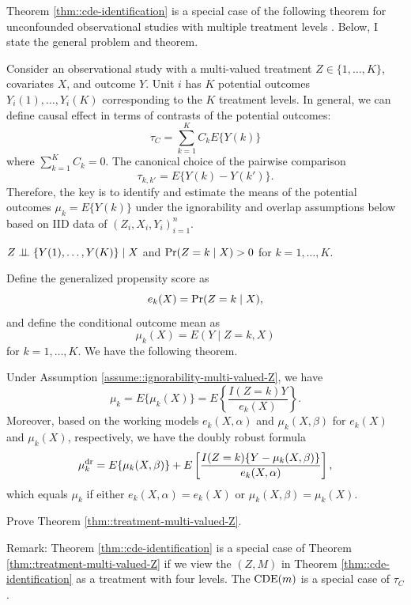 \begin{HomeworkProblem}\label{exr:28-2}

Theorem \ref{thm::cde-identification} is a special case of the following theorem for unconfounded observational studies with multiple treatment levels \citep{imai2004causal, cattaneo2010efficient}. Below, I state the general problem and theorem.



Consider an observational study with a multi-valued treatment $Z \in \{ 1, \ldots, K \}$, covariates $X$, and outcome $Y$. Unit $i$ has $K$ potential outcomes $Y_i(1), \ldots, Y_i(K)$ corresponding to the $K$ treatment levels. In general, we can define causal effect in terms of contrasts of the potential outcomes:
\[
\tau_C  = \sum_{k=1}^K C_k   E\{  Y(k) \}
\]
where $  \sum_{k=1}^K C_k  = 0$. The canonical choice of the pairwise comparison
\[
\tau_{k,k'} = E\{   Y(k) - Y(k') \}.
\]
Therefore, the key is to identify and estimate the means of the potential outcomes $\mu_k  =  E\{  Y(k) \}$ under the ignorability and overlap assumptions below based on IID data of $(Z_i,  X_i, Y_i)_{i=1}^n$.



\begin{assumption}
\label{assume::ignorability-multi-valued-Z}
$Z\mathrel{\perp\!\!\!\perp} \{ Y (1), \ldots, Y (K) \} \mid X$ and $\operatorname{Pr}(Z = k \mid X) > 0$ for $k=1,\ldots, K.$
\end{assumption}



Define the generalized propensity score as
\[
e_k(X) = \operatorname{Pr}(Z = k \mid X),
\]
and define the conditional outcome mean as
\[
\mu_k(X) = E(   Y \mid Z=k,  X )
\]
for $k=1, \ldots, K.$ We have the following theorem.

\begin{Theorem}
\label{thm::treatment-multi-valued-Z}
Under Assumption \ref{assume::ignorability-multi-valued-Z}, we have
\[
\mu_{k} = E\{  \mu_{k}(X) \}
= E \left\{   \frac{I(Z = k) Y}{  e_{k}(X)  }  \right\} .
\]
Moreover, based on the working models $e_{k}(X, \alpha) $ and $\mu_{k}(X, \beta) $ for $e_{k}(X) $ and $\mu_{k}(X) $, respectively, we have the doubly robust  formula
\[
\mu_{k}^{\textup{dr}}  = E\{  \mu_{k}(X, \beta) \} + E \left[   \frac{I(Z=k) \{ Y - \mu_{k}(X, \beta)  \}}{  e_{k}(X, \alpha)  }  \right],
\]
which equals $\mu_{k} $ if either $e_{k}(X, \alpha) = e_{k}(X)$ or $\mu_{k}(X, \beta)  = \mu_{k}(X)$.
\end{Theorem}


Prove Theorem \ref{thm::treatment-multi-valued-Z}.


Remark: Theorem \ref{thm::cde-identification} is a special case of Theorem \ref{thm::treatment-multi-valued-Z} if we view the $(Z,M)$ in Theorem \ref{thm::cde-identification} as a treatment with four levels. The $  \mathrm{CDE} (m) $ is a special case of $\tau_C $.



\end{HomeworkProblem}

